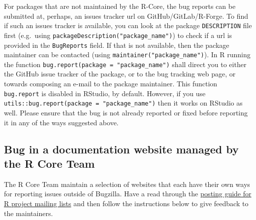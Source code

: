 \documentclass[
]{book}
\begin{document}
For packages that are not maintained by the R-Core, the bug reports can be submitted at, perhaps, an issues tracker url on GitHub/GitLab/R-Forge. To find if such an issues tracker is available, you can look at the package \texttt{DESCRIPTION} file first (e.g.~using \texttt{packageDescription("package\_name")}) to check if a url is provided in the \texttt{BugReports} field. If that is not available, then the package maintainer can be contacted (using \texttt{maintainer("package\_name")}). In R running the function \texttt{bug.report(package\ =\ "package\_name")} shall direct you to either the GitHub issue tracker of the package, or to the bug tracking web page, or towards composing an e-mail to the package maintainer. This function \texttt{bug.report} is disabled in RStudio, by default. However, if you use \texttt{utils::bug.report(package\ =\ "package\_name")} then it works on RStudio as well. Please ensure that the bug is not already reported or fixed before reporting it in any of the ways suggested above.

\subsection{Bug in a documentation website managed by the R Core Team}\label{docWebsRCoreBug}

The R Core Team maintain a selection of websites that each have their own ways for reporting issues outside of Bugzilla. Have a read through the \href{https://www.r-project.org/posting-guide.html}{posting guide for R project mailing lists} and then follow the instructions below to give feedback to the maintainers.
\end{document}
